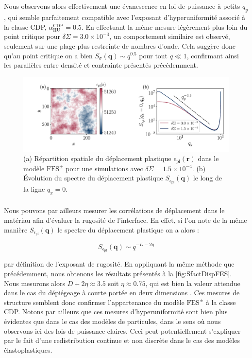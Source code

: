 \subparagraph{}Nous observons alors effectivement une évanescence en loi de puissance à petits $q_y$, qui semble parfaitement compatible avec l'exposant d'hyperuniformité associé à la classe CDP, $\alpha_\text{HU}^\text{CDP} = 0.5$. En effectuant la même mesure légèrement plus loin du point critique pour $\delta\Sigma = 3.0\times 10^{-3}$, un comportement similaire est observé, seulement sur une plage plus restreinte de nombres d'onde. Cela suggère donc qu'au point critique on a bien $S_\sigma(\mathbf{q})\sim q^{0.5}$ pour tout $q\ll 1$, confirmant ainsi les parallèles entre densité et contrainte présentés précédemment.

\begin{figure}[h]
	\centering	\includegraphics[width=\textwidth]{Chapitre4/Figures/Correlations/Sfact_Disp_SRPNC.pdf}
	\caption{(a) Répartition spatiale du déplacement plastique $\epsilon_\text{pl}(\mathbf{r})$ dans le modèle $\text{FES}^\pm$ pour une simulations avec $\delta\Sigma = 1.5\times 10^{-4}$. (b) Évolution du spectre du déplacement plastique $S_{\epsilon_\text{pl}}(\mathbf{q})$ le long de la ligne $q_x=0$.}
	\label{fig:SfactDispFES}
\end{figure}

\subparagraph{}Nous pouvons par ailleurs mesurer les corrélations de déplacement dans le matériau afin d'évaluer la rugosité de l'interface. En effet, si l'on note de la même manière $S_{\epsilon_\text{pl}}(\mathbf{q})$ le spectre du déplacement plastique on a alors :

\begin{equation}
	S_{\epsilon_\text{pl}}(\mathbf{q}) \sim q^{-D-2\eta}
\end{equation}

\noindent par définition de l'exposant de rugosité. En appliquant la même méthode que précédemment, nous obtenons les résultats présentés à la \autoref{fig:SfactDispFES}. Nous mesurons alors $D+2\eta \approx 3.5$ soit $\eta\approx 0.75$, qui est bien la valeur attendue dans le cas du dépiégeage à courte portée en deux dimensions \cite{semeikin_roughness_2024}. Ces mesures de structure semblent donc confirmer l'appartenance du modèle $\text{FES}^\pm$ à la classe CDP. Notons par ailleurs que ces mesures d'hyperuniformité sont bien plus évidentes que dans le cas des modèles de particules, dans le sens où nous observons ici des lois de puissance claires. Ceci peut potentiellement s'expliquer par le fait d'une redistribution continue et non discrète dans le cas des modèles élastoplastiques.


